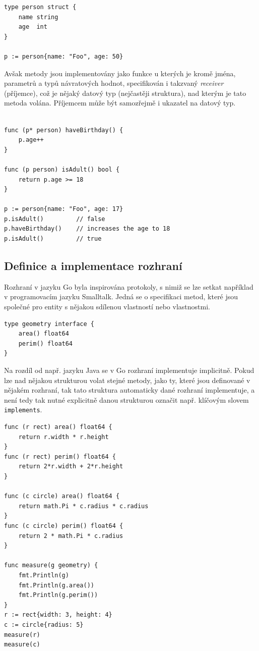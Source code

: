 \documentclass[12pt, a4paper]{article}
\begin{document}
\begin{lstlisting}[caption={Definice struktur}, captionpos=b, language=Golang]
type person struct {
    name string
    age  int
}

p := person{name: "Foo", age: 50}
\end{lstlisting}

Avšak metody jsou implementovány jako funkce u kterých je kromě jména, parametrů a typů návratových hodnot, specifikován i takzvaný \textit{receiver} (příjemce), což je nějaký datový typ (nejčastěji struktura), nad kterým je tato metoda volána. Příjemcem může být samozřejmě i ukazatel na datový typ.

\begin{lstlisting}[caption={Volání metod nad strukturami}, captionpos=b, language=Golang]

func (p* person) haveBirthday() {
    p.age++
}

func (p person) isAdult() bool {
    return p.age >= 18
}

p := person{name: "Foo", age: 17}
p.isAdult()         // false
p.haveBirthday()    // increases the age to 18
p.isAdult()         // true
\end{lstlisting}

\subsection{Definice a implementace rozhraní}
Rozhraní v jazyku Go byla inspirována protokoly, s nimiž se lze setkat například v programovacím jazyku Smalltalk. Jedná se o specifikaci metod, které jsou společné pro entity s nějakou sdílenou vlastností nebo vlastnostmi.

\begin{lstlisting}[caption={Definice rozhraní}, captionpos=b, language=Golang]
type geometry interface {
    area() float64
    perim() float64
}
\end{lstlisting}

Na rozdíl od např. jazyku Java se v Go rozhraní implementuje implicitně. Pokud lze nad nějakou strukturou volat stejné metody, jako ty, které jsou definované v nějakém rozhraní, tak tato struktura automaticky dané rozhraní implementuje, a není tedy tak nutné explicitně danou strukturou označit např. klíčovým slovem \texttt{implements}.


\begin{lstlisting}[caption={Implementace rozhraní \texttt{geometry}}, captionpos=b, language=Golang]
func (r rect) area() float64 {
    return r.width * r.height
}
func (r rect) perim() float64 {
    return 2*r.width + 2*r.height
}

func (c circle) area() float64 {
    return math.Pi * c.radius * c.radius
}
func (c circle) perim() float64 {
    return 2 * math.Pi * c.radius
}

func measure(g geometry) {
    fmt.Println(g)
    fmt.Println(g.area())
    fmt.Println(g.perim())
}
r := rect{width: 3, height: 4}
c := circle{radius: 5}
measure(r)
measure(c)
\end{lstlisting}
\end{document}

